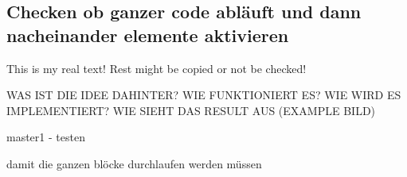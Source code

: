 \subsection{Checken ob ganzer code abläuft und dann nacheinander elemente aktivieren} \label{subsection:counter-modifications-flow}
This is my real text! Rest might be copied or not be checked!



WAS IST DIE IDEE DAHINTER? WIE FUNKTIONIERT ES? WIE WIRD ES IMPLEMENTIERT? WIE SIEHT DAS RESULT AUS (EXAMPLE BILD)\newline

master1 - testen\newline

damit die ganzen blöcke durchlaufen werden müssen
